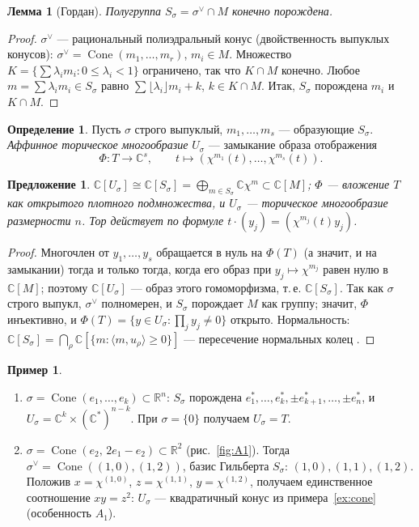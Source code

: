 \documentclass[11pt,a4paper]{article}
\theoremstyle{plain}
\newtheorem{proposition}[theorem]{Предложение}
\newtheorem{lemma}[theorem]{Лемма}
\theoremstyle{definition}
\newtheorem{definition}[theorem]{Определение}
\newtheorem{example}[theorem]{Пример}
\theoremstyle{remark}
\renewcommand{\C}{\mathbb{C}}
\newcommand{\R}{\mathbb{R}}
\DeclareMathOperator{\Cone}{Cone}
\begin{document}
\begin{lemma}[Гордан]
Полугруппа $S_\sigma=\sigma^\vee\cap M$ конечно порождена.
\end{lemma}
\begin{proof}
$\sigma^\vee$ --- рациональный полиэдральный конус (двойственность выпуклых конусов):
$\sigma^\vee=\Cone(m_1,\dots,m_r)$, $m_i\in M$. Множество
$K=\{\sum\lambda_im_i:0\le\lambda_i<1\}$ ограничено, так что $K\cap M$ конечно. Любое
$m=\sum\lambda_im_i\in S_\sigma$ равно $\sum\lfloor\lambda_i\rfloor m_i+k$, $k\in K\cap M$.
Итак, $S_\sigma$ порождена $m_i$ и $K\cap M$.
\end{proof}

\begin{definition}
Пусть $\sigma$ строго выпуклый, $m_1,\dots,m_s$ --- образующие $S_\sigma$. \emph{Аффинное
торическое многообразие} $U_\sigma$ --- замыкание образа отображения
\[
\Phi\colon T\to\C^s,\qquad t\mapsto(\chi^{m_1}(t),\dots,\chi^{m_s}(t)).
\]
\end{definition}

\begin{proposition}
$\C[U_\sigma]\cong\C[S_\sigma]=\bigoplus_{m\in S_\sigma}\C\chi^m\subset\C[M]$; $\Phi$ ---
вложение $T$ как открытого плотного подмножества, и $U_\sigma$ --- торическое многообразие размерности
$n$. Тор действует по формуле $t\cdot(y_j)=(\chi^{m_j}(t)y_j)$.
\end{proposition}
\begin{proof}
Многочлен от $y_1,\dots,y_s$ обращается в нуль на $\Phi(T)$ (а значит, и на замыкании) тогда и
только тогда, когда его образ при $y_j\mapsto\chi^{m_j}$ равен нулю в $\C[M]$; поэтому
$\C[U_\sigma]$ --- образ этого гомоморфизма, т.\,е. $\C[S_\sigma]$. Так как $\sigma$ строго выпукл,
$\sigma^\vee$ полномерен, и $S_\sigma$ порождает $M$ как группу; значит, $\Phi$ инъективно, и
$\Phi(T)=\{y\in U_\sigma:\prod_j y_j\neq0\}$ открыто. Нормальность: $\C[S_\sigma]=\bigcap_\rho
\C[\{m:\langle m,u_\rho\rangle\ge0\}]$ --- пересечение нормальных колец \cite[1.3.5]{CLS}.
\end{proof}

\begin{example}\label{ex:toric-affine}
\begin{enumerate}
\item $\sigma=\Cone(e_1,\dots,e_k)\subset\R^n$: $S_\sigma$ порождена $e_1^*,\dots,e_k^*,
\pm e_{k+1}^*,\dots,\pm e_n^*$, и $U_\sigma=\C^k\times(\C^*)^{n-k}$. При $\sigma=\{0\}$
получаем $U_\sigma=T$.
\item $\sigma=\Cone(e_2,\,2e_1-e_2)\subset\R^2$ (рис.~\ref{fig:A1}). Тогда
$\sigma^\vee=\Cone((1,0),(1,2))$, базис Гильберта $S_\sigma$: $(1,0),(1,1),(1,2)$. Положив
$x=\chi^{(1,0)}$, $z=\chi^{(1,1)}$, $y=\chi^{(1,2)}$, получаем единственное соотношение
$xy=z^2$: $U_\sigma$ --- квадратичный конус из примера~\ref{ex:cone} (особенность $A_1$).
\end{enumerate}
\end{example}
\end{document}
